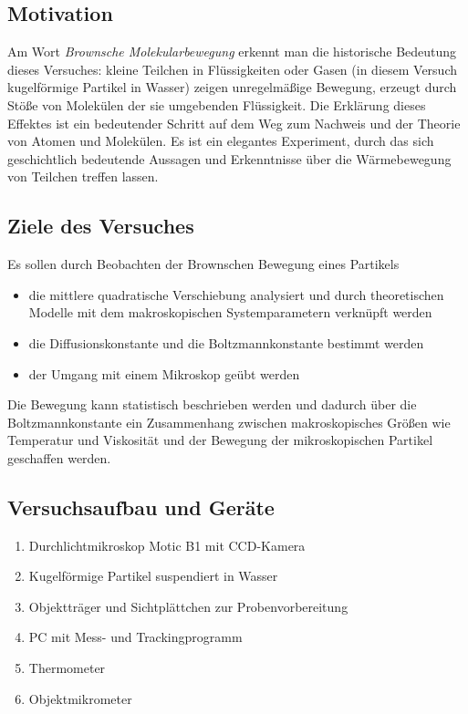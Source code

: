 \subsection{Motivation}
Am Wort \textit{Brownsche Molekularbewegung} erkennt man die historische Bedeutung dieses Versuches: kleine Teilchen in Flüssigkeiten oder Gasen (in diesem Versuch kugelförmige Partikel in Wasser) zeigen unregelmäßige Bewegung, erzeugt durch Stöße von Molekülen der sie umgebenden Flüssigkeit. Die Erklärung dieses Effektes ist ein bedeutender Schritt auf dem Weg zum Nachweis und der Theorie von Atomen und Molekülen. Es ist ein elegantes Experiment, durch das sich geschichtlich bedeutende Aussagen und Erkenntnisse über die Wärmebewegung von Teilchen treffen lassen. 

\subsection{Ziele des Versuches}
Es sollen durch Beobachten der Brownschen Bewegung eines Partikels
\begin{itemize}
    \item die mittlere quadratische Verschiebung analysiert und durch theoretischen Modelle mit dem makroskopischen Systemparametern verknüpft werden 
    \item die Diffusionskonstante und die Boltzmannkonstante bestimmt werden
    \item der Umgang mit einem Mikroskop geübt werden
\end{itemize}
Die Bewegung kann statistisch beschrieben werden und dadurch über die Boltzmannkonstante ein Zusammenhang zwischen makroskopisches Größen wie Temperatur und Viskosität und der Bewegung der mikroskopischen Partikel geschaffen werden.  

\subsection{Versuchsaufbau und Geräte}
\begin{enumerate}
    \item Durchlichtmikroskop Motic B1 mit CCD-Kamera
    \item Kugelförmige Partikel suspendiert in Wasser
    \item Objektträger und Sichtplättchen zur Probenvorbereitung 
    \item PC mit Mess- und Trackingprogramm
    \item Thermometer
    \item Objektmikrometer
\end{enumerate}


